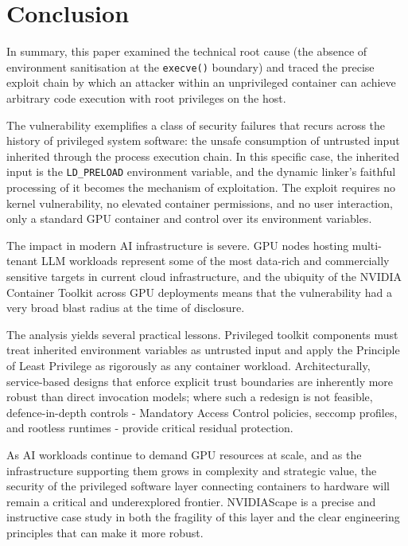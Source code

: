 \section{Conclusion}
\label{sec:conclusion}

In summary, this paper examined the technical root cause (the absence of environment sanitisation at the \texttt{execve()} boundary) and traced the precise exploit chain by which an attacker within an unprivileged container can achieve arbitrary code execution with root privileges on the host.
 
The vulnerability exemplifies a class of security failures that recurs across the history of privileged system software: the unsafe consumption of untrusted input inherited through the process execution chain. In this specific case, the inherited input is the \texttt{LD\_PRELOAD} environment variable, and the dynamic linker's faithful processing of it becomes the mechanism of exploitation. The exploit requires no kernel vulnerability, no elevated container permissions, and no user interaction, only a standard GPU container and control over its environment variables.
 
The impact in modern AI infrastructure is severe. GPU nodes hosting multi-tenant LLM workloads represent some of the most data-rich and commercially sensitive targets in current cloud infrastructure, and the ubiquity of the NVIDIA Container Toolkit across GPU deployments means that the vulnerability had a very broad blast radius at the time of disclosure.
 
The analysis yields several practical lessons. Privileged toolkit components must treat inherited environment variables as untrusted input and apply the Principle of Least Privilege as rigorously as any container workload. Architecturally, service-based designs that enforce explicit trust boundaries are inherently more robust than direct invocation models; where such a redesign is not feasible, defence-in-depth controls - Mandatory Access Control policies, seccomp profiles, and rootless runtimes - provide critical residual protection.
 
As AI workloads continue to demand GPU resources at scale, and as the infrastructure supporting them grows in complexity and strategic value, the security of the privileged software layer connecting containers to hardware will remain a critical and underexplored frontier. NVIDIAScape is a precise and instructive case study in both the fragility of this layer and the clear engineering principles that can make it more robust.